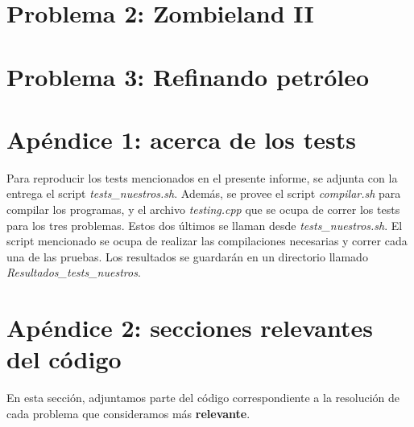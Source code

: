 \documentclass[a4paper]{article}
\begin{document}
\newpage
\section{Problema 2: Zombieland II}


\newpage
\section{Problema 3: Refinando petróleo}



\newpage
\section{Apéndice 1: acerca de los tests}
Para reproducir los tests mencionados en el presente informe, se adjunta con la entrega el script {\it tests_nuestros.sh}.  Además, se provee el script {\it compilar.sh} para compilar los programas, y el archivo {\it testing.cpp} que se ocupa de correr los tests para los tres problemas.  Estos dos últimos se llaman desde {\it tests_nuestros.sh}.
El script mencionado se ocupa de realizar las compilaciones necesarias y correr cada una de las pruebas. Los resultados se guardarán en un directorio llamado {\it Resultados_tests_nuestros}.

\newpage
\section{Apéndice 2: secciones relevantes del código}
En esta sección, adjuntamos parte del código correspondiente a la resolución de cada problema que consideramos más \textbf{relevante}.
\end{document}
